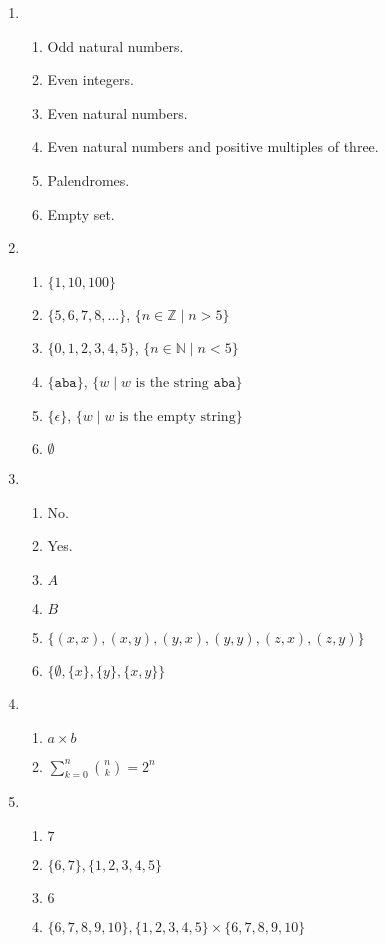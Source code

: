 \documentclass[11pt]{article}
\begin{document}
\begin{enumerate}[0.1]
  \item
  \begin{enumerate}
    \item Odd natural numbers.
    \item Even integers.
    \item Even natural numbers.
    \item Even natural numbers and positive multiples of three.
    \item Palendromes.
    \item Empty set.
  \end{enumerate}
  \item
  \begin{enumerate}
    \item $\{1,10,100\}$
    \item $\{5,6,7,8,...\}$, $\{n \in \mathbb{Z} \mid n > 5\}$
    \item $\{0,1,2,3,4,5\}$, $\{n \in \mathbb{N} \mid n < 5\}$
    \item $\{\texttt{aba}\}$, $\{w \mid w \text{ is the string } \texttt{aba}\}$
    \item $\{\epsilon\}$, $\{w \mid w \text{ is the empty string}\}$
    \item $\emptyset$
  \end{enumerate}
  \item
  \begin{enumerate}
    \item No.
    \item Yes.
    \item $A$
    \item $B$
    \item $\{(x,x),(x,y),(y,x),(y,y),(z,x),(z,y)\}$
    \item $\{\emptyset,\{x\},\{y\},\{x,y\}\}$
  \end{enumerate}
  \item
  \begin{enumerate}
    \item $a \times b$
    \item $\sum_{k=0}^n \binom{n}{k} = 2^n$
  \end{enumerate}
  \item
  \begin{enumerate}
    \item $7$
    \item $\{6,7\}, \{1,2,3,4,5\}$
    \item $6$
    \item $\{6,7,8,9,10\}, \{1,2,3,4,5\} \times \{6,7,8,9,10\}$

\end{enumerate}
\end{enumerate}
\end{document}
